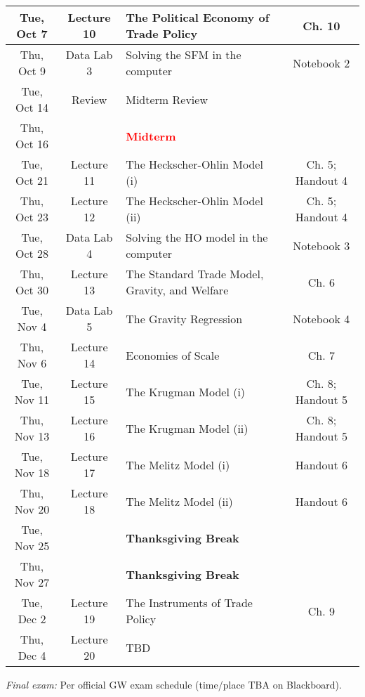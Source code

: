 \documentclass[11pt]{article}
\begin{document}
\begin{center}
\begin{tabular}{|c|c|l|c|}
        Tue, Oct 7 & Lecture 10 & The Political Economy of Trade Policy &  Ch. 10 \\ \hline

        Thu, Oct 9 &Data Lab 3 & Solving the SFM in the computer & Notebook 2 \\ \hline

        Tue, Oct 14 & Review & Midterm Review  &   \\ \hline
        Thu, Oct 16 &  & \textcolor{red}{\textbf{Midterm}} &   \\ \hline
		
        Tue,  Oct 21 &Lecture 11 & The Heckscher-Ohlin Model (i)  & Ch. 5; Handout 4  \\ \hline

        Thu, Oct 23 &  Lecture 12 & The Heckscher-Ohlin Model (ii) & Ch. 5; Handout 4  \\ \hline 

        Tue, Oct 28 &  Data Lab 4 & Solving the HO model in the computer & Notebook 3 \\ \hline

        Thu, Oct 30 & Lecture 13 & The Standard Trade Model, Gravity, and Welfare   &  Ch. 6   \\ \hline
        
        Tue, Nov 4 & Data Lab 5 & The Gravity Regression & Notebook 4 \\  \hline

        Thu, Nov 6 & Lecture 14 & Economies of Scale & Ch. 7   \\ \hline

        Tue, Nov 11 & Lecture 15 & The Krugman Model (i) & Ch. 8; Handout 5 \\  \hline

        Thu, Nov 13 &Lecture 16 & The Krugman Model (ii)   & Ch. 8; Handout 5   \\ \hline

        Tue, Nov 18 &Lecture 17 & The Melitz Model (i) & Handout 6  \\  \hline

        Thu, Nov 20 & Lecture 18 & The Melitz Model (ii)   &  Handout 6   \\ \hline

        Tue, Nov 25 &  & \textbf{Thanksgiving Break} &   \\  \hline

        Thu, Nov 27 &   & \textbf{Thanksgiving Break}    &    \\ \hline

        Tue, Dec 2 & Lecture 19 & The Instruments of Trade Policy & Ch. 9 \\  \hline

        Thu, Dec 4 &  Lecture 20 & TBD &    \\ \hline
\end{tabular}
\end{center}

\smallskip
\noindent \textit{Final exam:} Per official GW exam schedule (time/place TBA on Blackboard).
\end{document}
